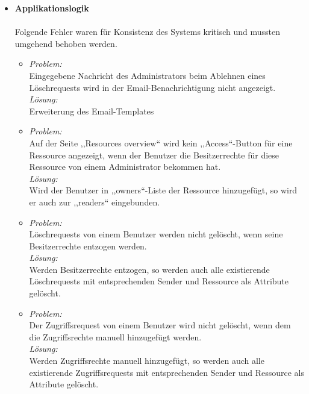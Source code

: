 \documentclass[parskip=full,11pt]{scrartcl}
\begin{document}
\renewcommand{\labelitemii}{$\bullet$}
\begin{itemize}
\item[] \textbf{Applikationslogik}\\\\
Folgende Fehler waren für Konsistenz des Systems kritisch und mussten umgehend behoben werden.
	\begin{itemize}
		\item \textit{Problem:}\\ Eingegebene Nachricht des Administrators beim Ablehnen eines Löschrequests wird in der Email-Benachrichtigung  nicht angezeigt.\\
			\textit{Lösung:}\\ Erweiterung des Email-Templates
		\item \textit{Problem:} \\Auf der Seite ,,Resources overview`` wird kein ,,Access``-Button für eine Ressource  angezeigt, wenn der Benutzer die Besitzerrechte für diese Ressource von einem Administrator bekommen hat.\\
		\textit{Lösung:} \\Wird der Benutzer in ,,owners``-Liste der Ressource hinzugefügt, so wird er auch zur ,,readers`` eingebunden.
		
		\item \textit{Problem:}\\
		Löschrequests von einem Benutzer werden nicht gelöscht, wenn seine Besitzerrechte entzogen werden.\\
		\textit{Lösung:}\\
		Werden Besitzerrechte entzogen, so werden auch alle existierende Löschrequests mit entsprechenden Sender und Ressource als Attribute gelöscht.
		\item \textit{Problem:}\\
		Der Zugriffsrequest von einem Benutzer wird nicht gelöscht, wenn dem die Zugriffsrechte manuell hinzugefügt werden.\\
		\textit{Lösung:}\\
		Werden Zugriffsrechte manuell hinzugefügt, so werden auch alle existierende Zugriffsrequests mit entsprechenden Sender und Ressource als Attribute gelöscht.
	\end{itemize}


\end{itemize}
\end{document}

